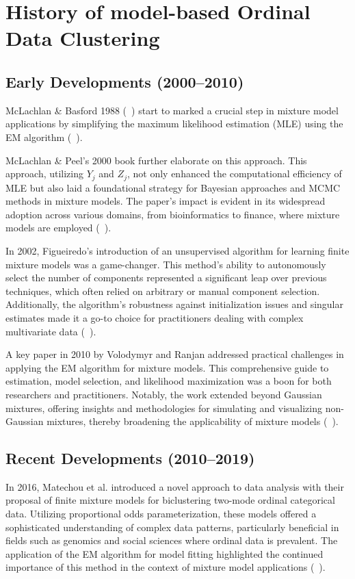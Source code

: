 \documentclass{article}
\begin{document}
\section{History of model-based Ordinal Data Clustering}

\subsection{Early Developments (2000--2010)}

McLachlan \& Basford 1988 (~\cite{mclachlan1988mixture}) start to marked a crucial step in mixture model applications by simplifying the maximum likelihood estimation (MLE) using the EM algorithm (~\cite{dempster1977maximum}).

McLachlan \& Peel's 2000 book further elaborate on this approach. This approach, utilizing $Y_j$ and $Z_j$, not only enhanced the computational efficiency of MLE but also laid a foundational strategy for Bayesian approaches and MCMC methods in mixture models. The paper’s impact is evident in its widespread adoption across various domains, from bioinformatics to finance, where mixture models are employed (~\cite{mclachlan2000finite}).

In 2002, Figueiredo's introduction of an unsupervised algorithm for learning finite mixture models was a game-changer. This method's ability to autonomously select the number of components represented a significant leap over previous techniques, which often relied on arbitrary or manual component selection. Additionally, the algorithm's robustness against initialization issues and singular estimates made it a go-to choice for practitioners dealing with complex multivariate data (~\cite{figueiredo2002unsupervised}).

A key paper in 2010 by Volodymyr and Ranjan addressed practical challenges in applying the EM algorithm for mixture models. This comprehensive guide to estimation, model selection, and likelihood maximization was a boon for both researchers and practitioners. Notably, the work extended beyond Gaussian mixtures, offering insights and methodologies for simulating and visualizing non-Gaussian mixtures, thereby broadening the applicability of mixture models (~\cite{10.1214/09-SS053}).

\subsection{Recent Developments (2010--2019)}

In 2016, Matechou et al. introduced a novel approach to data analysis with their proposal of finite mixture models for biclustering two-mode ordinal categorical data. Utilizing proportional odds parameterization, these models offered a sophisticated understanding of complex data patterns, particularly beneficial in fields such as genomics and social sciences where ordinal data is prevalent. The application of the EM algorithm for model fitting highlighted the continued importance of this method in the context of mixture model applications (~\cite{matechou2016biclustering}).
\end{document}

